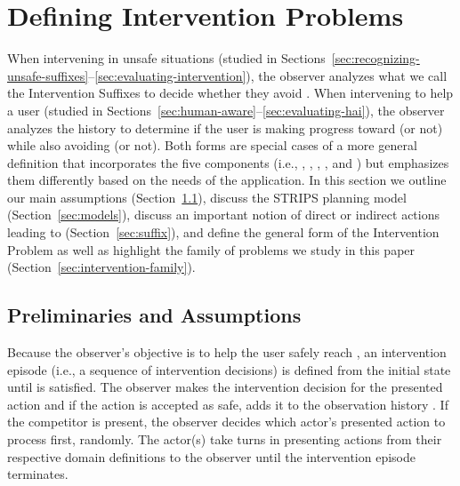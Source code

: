 \section{Defining Intervention Problems}
\label{sec:intervention-problem}
When intervening in unsafe situations (studied in Sections~\ref{sec:recognizing-unsafe-suffixes}--\ref{sec:evaluating-intervention}), the observer analyzes what we call the  Intervention Suffixes \Suffixes to decide whether they avoid \undesired.
When intervening to help a user (studied in Sections~\ref{sec:human-aware}--\ref{sec:evaluating-hai}), the observer analyzes the history \historyDef to determine if the user is making progress toward \desired (or not) while also avoiding \undesired (or not). 
Both forms are special cases of a more general definition that incorporates the five components (i.e., \desired, \undesired, \historyDef, \presentedAction, and \Suffixes) but emphasizes them differently based on the needs of the application.
In this section we outline our main assumptions (Section~\ref{sec:unsafe-suffix-prelim}), discuss the STRIPS planning model (Section~\ref{sec:models}), discuss an important notion of direct or indirect actions leading to \undesired (Section~\ref{sec:suffix}), and define the general form of the Intervention Problem as well as highlight the family of problems we study in this paper (Section~\ref{sec:intervention-family}).

\subsection{Preliminaries and Assumptions}
\label{sec:unsafe-suffix-prelim}
Because the observer's objective is to help the user safely reach \desired, an intervention episode (i.e., a sequence of intervention decisions) is defined from the initial state \initialState until \desired is satisfied.
The observer makes the intervention decision for the presented action and if the action is accepted as safe, 
adds it to the observation history \historyDef. 
If the competitor is present, the observer decides which actor's presented action to process first, randomly. 
The actor(s) take turns in presenting actions from their respective domain definitions to the observer until the intervention episode terminates.

